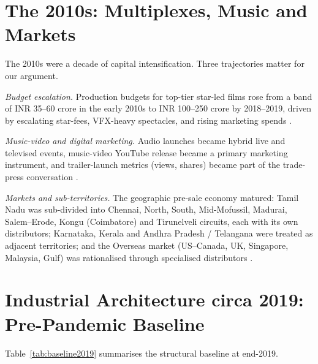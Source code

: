 \section{The 2010s: Multiplexes, Music and Markets}
\label{sec:2010s}

The 2010s were a decade of capital intensification.  Three
trajectories matter for our argument.

\textit{Budget escalation.}  Production budgets for top-tier
star-led films rose from a band of INR 35--60 crore in the early
2010s to INR 100--250 crore by 2018--2019, driven by escalating
star-fees, VFX-heavy spectacles, and rising marketing spends
\citep{ravindran2018,kohlikhandekar2013}.

\textit{Music-video and digital marketing.}  Audio launches became
hybrid live and televised events, music-video YouTube release
became a primary marketing instrument, and trailer-launch metrics
(views, shares) became part of the trade-press conversation
\citep{velayutham2019,filmcompanion2019audio}.

\textit{Markets and sub-territories.}  The geographic pre-sale
economy matured: Tamil Nadu was sub-divided into Chennai, North,
South, Mid-Mofussil, Madurai, Salem--Erode, Kongu (Coimbatore) and
Tirunelveli circuits, each with its own distributors; Karnataka,
Kerala and Andhra Pradesh / Telangana were treated as adjacent
territories; and the Overseas market (US--Canada, UK, Singapore,
Malaysia, Gulf) was rationalised through specialised distributors
\citep{kohlikhandekar2013}.

\section{Industrial Architecture circa 2019: Pre-Pandemic
Baseline}
\label{sec:baseline2019}

Table~\ref{tab:baseline2019} summarises the structural baseline at
end-2019.

